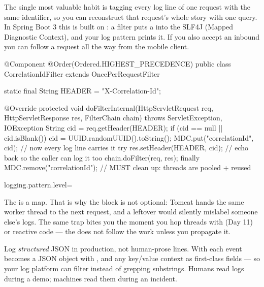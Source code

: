  The single most valuable habit is tagging every log line of one request with the same identifier, so you can reconstruct that request's whole story with one query. In Spring Boot 3 this is built on : a filter puts a  into the SLF4J  (Mapped Diagnostic Context), and your log pattern prints it. If you also accept an inbound  you can follow a request all the way from the mobile client.

\begin{javabox}
@Component
@Order(Ordered.HIGHEST_PRECEDENCE)
public class CorrelationIdFilter extends OncePerRequestFilter {

  static final String HEADER = "X-Correlation-Id";

  @Override
  protected void doFilterInternal(HttpServletRequest req,
      HttpServletResponse res, FilterChain chain)
      throws ServletException, IOException {
    String cid = req.getHeader(HEADER);
    if (cid == null || cid.isBlank()) {
      cid = UUID.randomUUID().toString();
    }
    MDC.put("correlationId", cid);       // now every log line carries it
    try {
      res.setHeader(HEADER, cid);        // echo back so the caller can log it too
      chain.doFilter(req, res);
    } finally {
      MDC.remove("correlationId");       // MUST clean up: threads are pooled + reused
    }
  }
}
\end{javabox}

\begin{propsbox}
logging.pattern.level=%
\end{propsbox}

\begin{behind}
The  is a  map. That is why the  block is not optional: Tomcat hands the same worker thread to the next request, and a leftover  would silently mislabel someone else's logs. The same trap bites you the moment you hop threads with  (Day 11) or reactive code --- the  does not follow the work unless you propagate it.
\end{behind}

\begin{prodtip}
Log \emph{structured} JSON in production, not human-prose lines. With  each event becomes a JSON object with ,  and any key/value context as first-class fields --- so your log platform can filter  instead of grepping substrings. Humans read logs during a demo; machines read them during an incident.
\end{prodtip}

